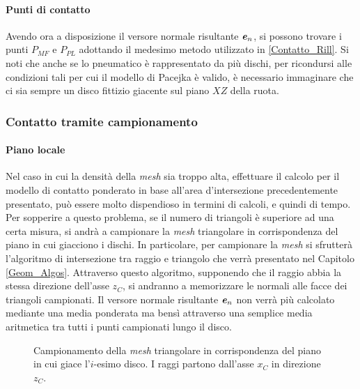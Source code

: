 \paragraph{Punti di contatto}
Avendo ora a disposizione il versore normale risultante $\textbf{\textit{e}}_n$, si possono trovare i punti $P_{MF}$ e $P_{PL}$ adottando il medesimo metodo utilizzato in \ref{Contatto_Rill}. Si noti che anche se lo pneumatico è rappresentato da più dischi, per ricondursi alle condizioni tali per cui il modello di Pacejka è valido, è necessario immaginare che ci sia sempre un disco fittizio giacente sul piano $XZ$ della ruota.
%
\subsubsection{Contatto tramite campionamento}
\paragraph{Piano locale}
Nel caso in cui la densità della \textit{mesh} sia troppo alta, effettuare il calcolo per il modello di contatto ponderato in base all'area d'intersezione precedentemente presentato, può essere molto dispendioso in termini di calcoli, e quindi di tempo. Per sopperire a questo problema, se il numero di triangoli è superiore ad una certa misura, si andrà a campionare la \textit{mesh} triangolare in corrispondenza del piano in cui giacciono i dischi. In particolare, per campionare la \textit{mesh} si sfrutterà l'algoritmo di intersezione tra raggio e triangolo che verrà presentato nel Capitolo \ref{Geom_Algos}. Attraverso questo algoritmo, supponendo che il raggio abbia la stessa direzione dell'asse $z_C$, si andranno a memorizzare le normali alle facce dei triangoli campionati. Il versore normale risultante $\textbf{\textit{e}}_n$ non verrà più calcolato mediante una media ponderata ma bensì attraverso una semplice media aritmetica tra tutti i punti campionati lungo il disco.

\begin{figure}
	\centering
	\caption{Campionamento della \textit{mesh} triangolare in corrispondenza del piano in cui giace l'$i$-esimo disco. I raggi partono dall'asse $x_C$ in direzione $z_C$.}
\end{figure}


